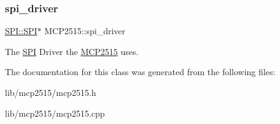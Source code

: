 \subsubsection{\texorpdfstring{spi\+\_\+driver}{spi\_driver}}
{\footnotesize\ttfamily \hyperlink{class_s_p_i_1_1_s_p_i}{S\+P\+I\+::\+S\+PI}$\ast$ M\+C\+P2515\+::spi\+\_\+driver\hspace{0.3cm}{\ttfamily [private]}}

The \hyperlink{namespace_s_p_i}{S\+PI} Driver the \hyperlink{class_m_c_p2515}{M\+C\+P2515} uses. 

The documentation for this class was generated from the following files\+:\begin{DoxyCompactItemize}
\item 
lib/mcp2515/mcp2515.\+h\item 
lib/mcp2515/mcp2515.\+cpp\end{DoxyCompactItemize}
